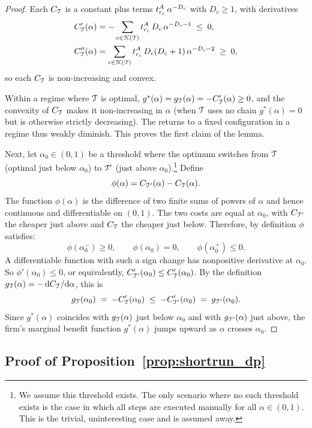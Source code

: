 \begin{proof}
Each $C_{\mathcal{T}}$ is a constant plus terms $t^{A}_{r_c}\,\alpha^{-D_c}$ with $D_c \ge 1$, with derivatives
\[
\begin{aligned}
C_{\mathcal{T}}'(\alpha) &= -\sum_{c \in \mathcal{K}(\mathcal{T})} t^{A}_{r_c}\,D_c\,\alpha^{-D_c-1} \;\le\; 0, \\
C_{\mathcal{T}}''(\alpha) &= \sum_{c \in \mathcal{K}(\mathcal{T})} t^{A}_{r_c}\,D_c(D_c+1)\,\alpha^{-D_c-2} \;\ge\; 0,
\end{aligned}
\]
so each $C_{\mathcal{T}}$ is non-increasing and convex.

Within a regime where $\mathcal{T}$ is optimal, $g^*(\alpha) = g_{\mathcal{T}}(\alpha) = -C_{\mathcal{T}}'(\alpha) \ge 0$, and the convexity of $C_{\mathcal{T}}$ makes it non-increasing in $\alpha$ (when $\mathcal{T}$ uses no chain $g^*(\alpha) = 0$ but is otherwise strictly decreasing).
The returns to a fixed configuration in a regime thus weakly diminish.
This proves the first claim of the lemma.

Next, let $\alpha_0 \in (0,1)$ be a threshold where the optimum switches from $\mathcal{T}$ (optimal just below $\alpha_0$) to $\mathcal{T}'$ (just above $\alpha_0$).\footnote{We assume this threshold exists. The only scenario where no such threshold exists is the case in which all steps are executed manually for all $\alpha \in (0,1)$. This is the trivial, uninteresting case and is assumed away.}
Define
\[
\phi(\alpha) = C_{\mathcal{T}'}(\alpha) - C_{\mathcal{T}}(\alpha).
\]
The function $\phi(\alpha)$ is the difference of two finite sums of powers of $\alpha$ and hence continuous and differentiable on $(0,1)$. 
The two costs are equal at $\alpha_0$, with $C_{\mathcal{T}'}$ the cheaper just above and $C_{\mathcal{T}}$ the cheaper just below.
Therefore, by definition $\phi$ satisfies:
\[
\phi(\alpha_0^{-}) \ge 0,
\qquad
\phi(\alpha_0) = 0,
\qquad
\phi(\alpha_0^{+}) \le 0.
\]
A differentiable function with such a sign change has nonpositive derivative at $\alpha_0$.
So $\phi'(\alpha_0) \le 0$, or equivalently, $C_{\mathcal{T}'}'(\alpha_0) \le C_{\mathcal{T}}'(\alpha_0)$.
By the definition $g_{\mathcal{T}}(\alpha) = -\,\mathrm{d}C_{\mathcal{T}}/\mathrm{d}\alpha$, this is
\[
g_{\mathcal{T}}(\alpha_0) \;=\; -C_{\mathcal{T}}'(\alpha_0)
\;\le\;
-C_{\mathcal{T}'}'(\alpha_0) \;=\; g_{\mathcal{T}'}(\alpha_0).
\]
Since $g^*(\alpha)$ coincides with $g_{\mathcal{T}}(\alpha)$ just below $\alpha_0$ and with $g_{\mathcal{T}'}(\alpha)$ just above, the firm's marginal benefit function $g^*(\alpha)$ jumps upward as $\alpha$ crosses $\alpha_0$.
\end{proof}

\subsection{Proof of Proposition~\ref{prop:shortrun_dp}}
\label{app:shortrun_proof}

